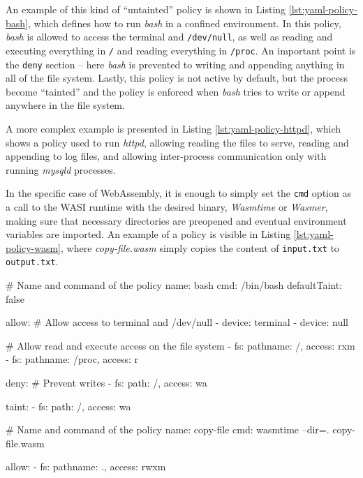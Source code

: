 An example of this kind of ``untainted'' policy is shown in Listing \ref{lst:yaml-policy-bash}, which defines how to
run \textit{bash} in a confined environment.
In this policy, \textit{bash} is allowed to access the terminal and \texttt{/dev/null}, as well
as reading and executing everything in \texttt{/} and reading everything in \texttt{/proc}.
An important point is the \texttt{deny} section -- here \textit{bash} is prevented to writing and
appending anything in all of the file system.
Lastly, this policy is not active by default, but the process become ``tainted'' and the policy is enforced
when \textit{bash} tries to write or append anywhere in the file system.

A more complex example is presented in Listing \ref{lst:yaml-policy-httpd}, which shows a policy
used to run \textit{httpd}, allowing reading the files to serve, reading and appending to log files,
and allowing inter-process communication only with running \textit{mysqld} processes.

In the specific case of WebAssembly, it is enough to simply set the \texttt{cmd} option as
a call to the WASI runtime with the desired binary, \textit{Wasmtime} or \textit{Wasmer}, making sure that
necessary directories are preopened and eventual environment variables are imported.
An example of a policy is visible in Listing \ref{lst:yaml-policy-wasm}, where \textit{copy-file.wasm} simply copies
the content of \texttt{input.txt} to \texttt{output.txt}.

\vspace*{0.5cm}
\begin{code}[language=yaml, caption=A policy for running bash., label=lst:yaml-policy-bash]
# Name and command of the policy
name: bash
cmd: /bin/bash
defaultTaint: false

allow:
  # Allow access to terminal and /dev/null
  - device: terminal
  - device: null

  # Allow read and execute access on the file system
  - fs: {pathname: /, access: rxm}
  - fs: {pathname: /proc, access: r}

deny:
  # Prevent writes
  - fs: {path: /, access: wa}

taint:
  - fs: {path: /, access: wa}
\end{code}

\begin{code}[language=yaml, caption=Running WASM with BPFContain., label=lst:yaml-policy-wasm]
# Name and command of the policy
name: copy-file
cmd: wasmtime --dir=. copy-file.wasm

allow:
  - fs: {pathname: ., access: rwxm}
\end{code}

